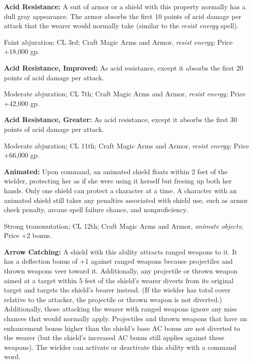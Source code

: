 \vspace{12pt}
\textbf{Acid Resistance:} A suit of armor or a shield with this property normally 
has a dull gray appearance. The armor absorbs the first 10 points of acid damage 
per attack that the wearer would normally take (similar to the \textit{resist energy 
}spell).

Faint abjuration; CL 3rd; Craft Magic Arms and Armor, \textit{resist energy; }Price 
+18,000 gp.

\textbf{Acid Resistance, Improved:} As acid resistance, except it absorbs the first 
20 points of acid damage per attack.

Moderate abjuration; CL 7th; Craft Magic Arms and Armor, \textit{resist energy; 
}Price +42,000 gp.

\textbf{Acid Resistance, Greater:} As acid resistance, except it absorbs the first 
30 points of acid damage per attack.

Moderate abjuration; CL 11th; Craft Magic Arms and Armor, \textit{resist energy; 
}Price +66,000 gp.

\textbf{Animated:} Upon command, an animated shield floats within 2 feet of the 
wielder, protecting her as if she were using it herself but freeing up both her 
hands. Only one shield can protect a character at a time. A character with an animated 
shield still takes any penalties associated with shield use, such as armor check 
penalty, arcane spell failure chance, and nonproficiency.

Strong transmutation\textit{; }CL 12th; Craft Magic Arms and Armor, \textit{animate 
objects; }Price +2 bonus.

\textbf{Arrow Catching:} A shield with this ability attracts ranged weapons to 
it. It has a deflection bonus of +1 against ranged weapons because projectiles 
and thrown weapons veer toward it. Additionally, any projectile or thrown weapon 
aimed at a target within 5 feet of the shield's wearer diverts from its original 
target and targets the shield's bearer instead. (If the wielder has total cover 
relative to the attacker, the projectile or thrown weapon is not diverted.) Additionally, 
those attacking the wearer with ranged weapons ignore any miss chances that would 
normally apply. Projectiles and thrown weapons that have an enhancement bonus higher 
than the shield's base AC bonus are not diverted to the wearer (but the shield's 
increased AC bonus still applies against these weapons). The wielder can activate 
or deactivate this ability with a command word.

